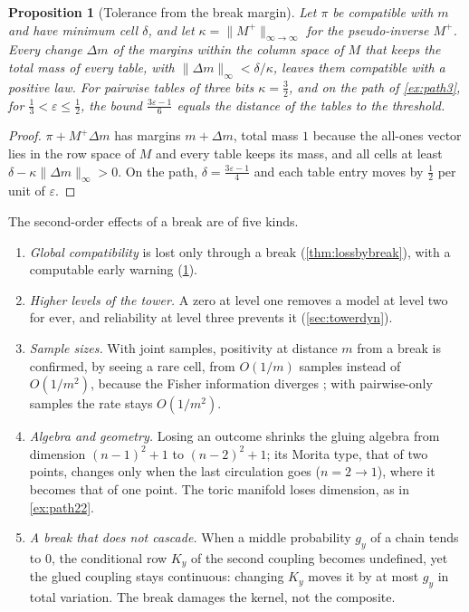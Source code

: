 \documentclass[11pt]{article}
\newtheorem{proposition}[theorem]{Proposition}
\theoremstyle{definition}
\theoremstyle{remark}
\begin{document}
\begin{proposition}[Tolerance from the break margin]\label{prop:tolerance}
Let $\pi$ be compatible with $m$ and have minimum cell $\delta$, and let $\kappa=\lVert M^+\rVert_{\infty\to\infty}$ for the pseudo-inverse
$M^+$. Every change $\Delta m$ of the margins within the column space of $M$ that keeps the total mass of every table, with $\lVert\Delta m\rVert_\infty<\delta/\kappa$, leaves
them compatible with a positive law. For pairwise tables of three bits $\kappa=\frac32$, and on the path of \cref{ex:path3}, for $\frac13<\varepsilon\le\frac12$, the bound
$\frac{3\varepsilon-1}6$ equals the distance of the tables to the threshold.
\end{proposition}
\begin{proof}
$\pi+M^+\Delta m$ has margins $m+\Delta m$, total mass $1$ because the all-ones vector lies in the row space of $M$ and every table keeps its
mass, and all cells at least
$\delta-\kappa\lVert\Delta m\rVert_\infty>0$. On the path, $\delta=\frac{3\varepsilon-1}4$ and each table entry moves by $\frac12$ per unit of $\varepsilon$.
\end{proof}

The second-order effects of a break are of five kinds.
\begin{enumerate}[label=(\alph*),leftmargin=*]
\item \emph{Global compatibility} is lost only through a break (\cref{thm:lossbybreak}), with a computable early warning
  (\cref{prop:tolerance}).
\item \emph{Higher levels of the tower.} A zero at level one removes a model at level two for ever, and reliability at level three
  prevents it (\cref{sec:towerdyn}).
\item \emph{Sample sizes.} With joint samples, positivity at distance $m$ from a break is confirmed, by seeing a rare cell, from $O(1/m)$
  samples instead of $O(1/m^2)$, because the Fisher information diverges \cite[\S3]{Bridges}; with pairwise-only samples the rate stays
  $O(1/m^2)$.
\item \emph{Algebra and geometry.} Losing an outcome shrinks the gluing algebra from dimension $(n-1)^2+1$ to $(n-2)^2+1$; its Morita
  type, that of two points, changes only when the last circulation goes ($n=2\to1$), where it becomes that of one point. The toric
  manifold loses dimension, as in \cref{ex:path22}.
\item \emph{A break that does not cascade.} When a middle probability $g_y$ of a chain tends to $0$, the conditional row $K_y$ of the second
  coupling becomes undefined, yet the glued coupling stays continuous: changing $K_y$ moves it by at most $g_y$ in total variation. The break damages the
  kernel, not the composite.
\end{enumerate}
\end{document}
